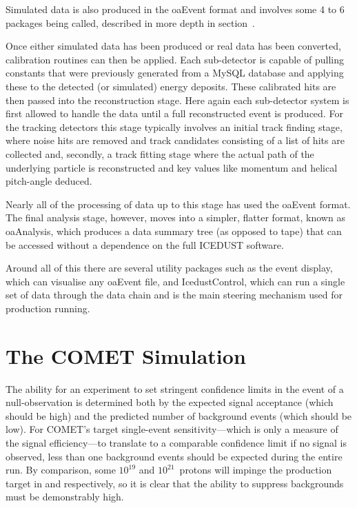 Simulated data is also produced in the oaEvent format and involves some 4 to 6 packages being called, described in more depth in section~.

Once either simulated data has been produced or real data has been converted, calibration routines can then be applied.
Each sub-detector is capable of pulling constants that were previously generated from a MySQL database and applying these to the detected (or simulated) energy deposits.
These calibrated hits are then passed into the reconstruction stage.  
Here again each sub-detector system is first allowed to handle the data until a full reconstructed event is produced.
For the tracking detectors this stage typically involves an initial track finding stage, where noise hits are removed and track candidates consisting of a list of hits are collected and, secondly, a track fitting stage where the actual path of the underlying particle is reconstructed and key values like momentum and helical pitch-angle deduced.

Nearly all of the processing of data up to this stage has used the oaEvent format.
The final analysis stage, however, moves into a simpler, flatter format, known as oaAnalysis, which produces a data summary tree (as opposed to tape) that can be accessed without a dependence on the full ICEDUST software.

Around all of this there are several utility packages such as the event display, which can visualise any oaEvent file, and IcedustControl, which can run a single set of data through the data chain and is the main steering mechanism used for production running.

\section{The COMET Simulation}
The ability for an experiment to set stringent confidence limits in the event of a null-observation is determined both by the expected signal acceptance (which should be high) and the predicted number of background events (which should be low).
For COMET's target single-event sensitivity---which is only a measure of the signal efficiency---to translate to a comparable confidence limit if no signal is observed, less than one background events should be expected during the entire run.
By comparison, some $10^{19}$ and $10^{21}$~protons will impinge the production target in \phaseI and \phaseII respectively, so it is clear that the ability to suppress backgrounds must be demonstrably high.

